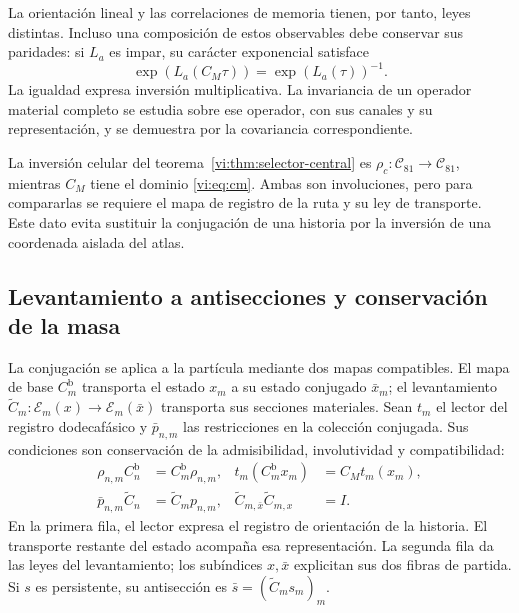La orientación lineal y las correlaciones de memoria tienen, por tanto,
leyes distintas. Incluso una composición de estos observables debe
conservar sus paridades: si $L_a$ es impar, su carácter exponencial
satisface
\begin{equation}
 \exp(L_a(C_M\tau))=\exp(L_a(\tau))^{-1}.
 \label{vi:eq:caracter-inverso}
\end{equation}
La igualdad expresa inversión multiplicativa. La invariancia de un
operador material completo se estudia sobre ese operador, con sus
canales y su representación, y se demuestra por la covariancia
correspondiente.

La inversión celular del teorema~\ref{vi:thm:selector-central} es
$\rho_c:\mathcal C_{81}\to\mathcal C_{81}$, mientras $C_M$ tiene
el dominio \eqref{vi:eq:cm}. Ambas son involuciones, pero para
compararlas se requiere el mapa de registro de la ruta y su ley de
transporte. Este dato evita sustituir la conjugación de una historia
por la inversión de una coordenada aislada del atlas.

\subsection{Levantamiento a antisecciones y conservación de la masa}
\label{vi:subsec:antisecciones}

La conjugación se aplica a la partícula mediante dos mapas
compatibles. El mapa de base $C_m^{\mathrm b}$ transporta el estado
$x_m$ a su estado conjugado $\bar x_m$; el levantamiento
$\widetilde C_m:\mathscr E_m(x)\to\mathscr E_m(\bar x)$
transporta sus secciones materiales. Sean $t_m$ el lector del
registro dodecafásico y $\bar p_{n,m}$ las restricciones en la
colección conjugada. Sus condiciones son conservación de la
admisibilidad, involutividad y compatibilidad:
\begin{equation}
 \begin{aligned}
 \rho_{n,m}C_n^{\mathrm b}&=C_m^{\mathrm b}\rho_{n,m},
 &t_m(C_m^{\mathrm b}x_m)&=C_Mt_m(x_m),\\
 \bar p_{n,m}\widetilde C_n&=\widetilde C_mp_{n,m},
 &\widetilde C_{m,\bar x}\widetilde C_{m,x}&=I.
 \end{aligned}
 \label{vi:eq:levantamiento-cm}
\end{equation}
En la primera fila, el lector expresa el registro de orientación
de la historia. El transporte restante del estado acompaña esa
representación. La segunda fila da las leyes del levantamiento;
los subíndices $x,\bar x$ explicitan sus dos fibras de partida.
Si $s$ es persistente, su antisección es
$\bar s=(\widetilde C_ms_m)_m$.

